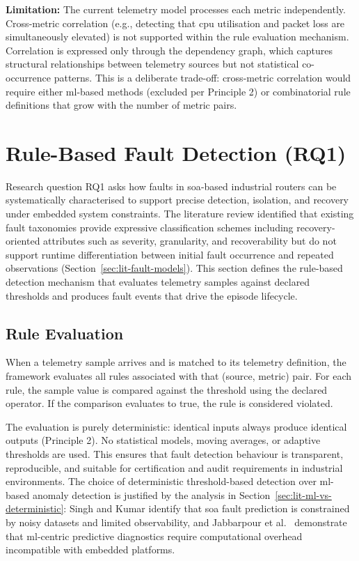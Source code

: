 \textbf{Limitation:} The current telemetry model processes each metric independently. Cross-metric correlation (e.g., detecting that \gls{cpu} utilisation and packet loss are simultaneously elevated) is not supported within the rule evaluation mechanism. Correlation is expressed only through the dependency graph, which captures structural relationships between telemetry sources but not statistical co-occurrence patterns. This is a deliberate trade-off: cross-metric correlation would require either \gls{ml}-based methods (excluded per Principle 2) or combinatorial rule definitions that grow with the number of metric pairs.

\section{Rule-Based Fault Detection (RQ1)}\label{sec:rule-based-detection}

Research question RQ1 asks how faults in \gls{soa}-based industrial routers can be systematically characterised to support precise detection, isolation, and recovery under embedded system constraints. The literature review identified that existing fault taxonomies provide expressive classification schemes including recovery-oriented attributes such as severity, granularity, and recoverability \cite{ref1,ref2} but do not support runtime differentiation between initial fault occurrence and repeated observations (Section~\ref{sec:lit-fault-models}). This section defines the rule-based detection mechanism that evaluates telemetry samples against declared thresholds and produces fault events that drive the episode lifecycle.

\subsection{Rule Evaluation}\label{sec:rule-evaluation}

When a telemetry sample arrives and is matched to its telemetry definition, the framework evaluates all rules associated with that (source, metric) pair. For each rule, the sample value is compared against the threshold using the declared operator. If the comparison evaluates to true, the rule is considered violated.

The evaluation is purely deterministic: identical inputs always produce identical outputs (Principle 2). No statistical models, moving averages, or adaptive thresholds are used. This ensures that fault detection behaviour is transparent, reproducible, and suitable for certification and audit requirements in industrial environments. The choice of deterministic threshold-based detection over \gls{ml}-based anomaly detection is justified by the analysis in Section~\ref{sec:lit-ml-vs-deterministic}: Singh and Kumar \cite{ref6} identify that \gls{soa} fault prediction is constrained by noisy datasets and limited observability, and Jabbarpour et al.\ \cite{ref22} demonstrate that \gls{ml}-centric predictive diagnostics require computational overhead incompatible with embedded platforms.

